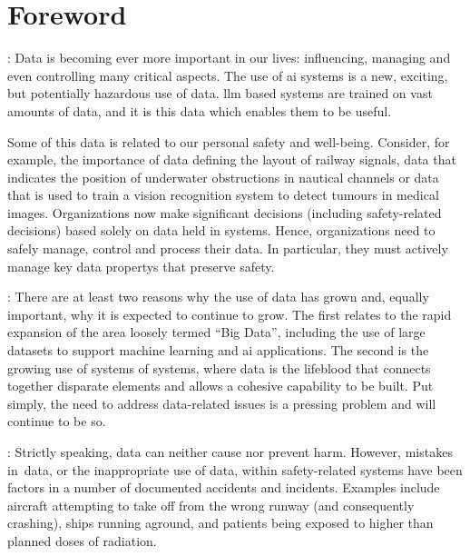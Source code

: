 \makeatletter		%
\dsiwg@intblankpage
\makeatother

\pagestyle{FirstPageFrontMatter}
\section*{Foreword}


:
Data is becoming ever more important in our lives: influencing, managing and even controlling many critical aspects.
The use of \gls{ai} systems is a new, exciting, but potentially hazardous use of data. \Gls{llm} based systems are trained on vast amounts of data, and it is this data which enables them to be useful.

Some of this data is related to our personal safety and well-being.
Consider, for example, the importance of data defining the layout of railway signals,
data that indicates the position of underwater obstructions in nautical channels or data that
is used to train a vision recognition system to detect tumours in medical images.
Organizations now make significant decisions (including safety-related decisions) based solely on data held in systems.
Hence, organizations need to safely manage, control and process their data.
In particular, they must actively manage key \glspl{data property} that preserve safety.

: There are at least two reasons why the use of data has grown and, equally important, why it is expected to continue to grow. The  first relates to the rapid expansion of the area loosely termed ``Big Data'', including the use of large \glspl{dataset} to support machine learning and \gls{ai} applications. The second is the growing use of systems of systems, where data is the lifeblood that connects together disparate elements and allows a cohesive capability to be built. Put simply, the need to address data-related issues is a pressing problem and will continue to be so.

: Strictly speaking,
data can neither cause nor prevent harm.
However, \cbstart mistakes in\cbend\ data, or the inappropriate use of data, within safety-related systems have been factors in a number of documented accidents and incidents. Examples include aircraft attempting to take off from the wrong runway (and consequently crashing), ships running aground, and patients being exposed to higher than planned doses of radiation.

